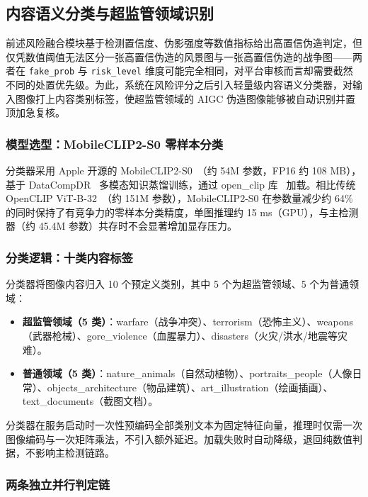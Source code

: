 \documentclass[UTF8, a4paper, 12pt]{ctexart}
\begin{document}
\subsection{内容语义分类与超监管领域识别}
\label{sec:content-classifier}

前述风险融合模块基于检测置信度、伪影强度等数值指标给出高置信伪造判定，但仅凭数值阈值无法区分一张高置信伪造的风景图与一张高置信伪造的战争图——两者在 \texttt{fake\_prob} 与 \texttt{risk\_level} 维度可能完全相同，对平台审核而言却需要截然不同的处置优先级。为此，系统在风险评分之后引入轻量级内容语义分类器，对输入图像打上内容类别标签，使超监管领域的 AIGC 伪造图像能够被自动识别并置顶加急复核。

\subsubsection{模型选型：MobileCLIP2-S0 零样本分类}

分类器采用 Apple 开源的 MobileCLIP2-S0~\cite{vasudevan2024mobileclip}（约 54M 参数，FP16 约 108 MB），基于 DataCompDR~\cite{gadre2023datacomp} 多模态知识蒸馏训练，通过 open\_clip 库~\cite{ilharco2021openclip} 加载。相比传统 OpenCLIP ViT-B-32~\cite{radford2021learning}（约 151M 参数），MobileCLIP2-S0 在参数量减少约 64\% 的同时保持了有竞争力的零样本分类精度，单图推理约 15 ms（GPU），与主检测器（约 45.4M 参数）共存时不会显著增加显存压力。

\subsubsection{分类逻辑：十类内容标签}

分类器将图像内容归入 10 个预定义类别，其中 5 个为超监管领域、5 个为普通领域：

\begin{itemize}
 \item \textbf{超监管领域（5 类）}：warfare（战争冲突）、terrorism（恐怖主义）、weapons（武器枪械）、gore\_violence（血腥暴力）、disasters（火灾/洪水/地震等灾难）。
 \item \textbf{普通领域（5 类）}：nature\_animals（自然动植物）、portraits\_people（人像日常）、objects\_architecture（物品建筑）、art\_illustration（绘画插画）、text\_documents（截图文档）。
\end{itemize}

分类器在服务启动时一次性预编码全部类别文本为固定特征向量，推理时仅需一次图像编码与一次矩阵乘法，不引入额外延迟。加载失败时自动降级，退回纯数值判据，不影响主检测链路。

\subsubsection{两条独立并行判定链}
\end{document}
